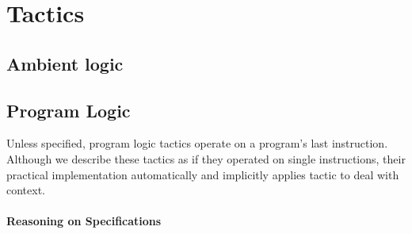 \section{Tactics}

\subsection{Ambient logic}












































\subsection{Program Logic}

Unless specified, program logic tactics operate on a program's last
instruction. Although we describe these tactics as if they operated on
single instructions, their practical implementation automatically and
implicitly applies tactic  to deal with context.

\medskip

\paragraph{Reasoning on Specifications}








%

